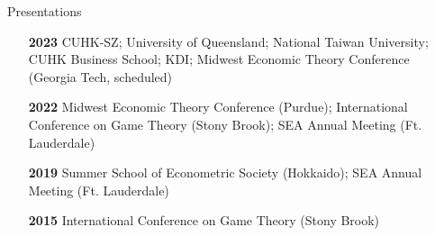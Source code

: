 \begin{rSection}{Presentations}

\begin{itemize}
	\item [\textbf{2023}] CUHK-SZ; University of Queensland; National Taiwan University; CUHK Business School; KDI; Midwest Economic Theory Conference (Georgia Tech, scheduled)
	\item [\textbf{2022}] Midwest Economic Theory Conference (Purdue); International Conference on Game Theory (Stony Brook); SEA Annual Meeting (Ft. Lauderdale)
	\item [\textbf{2019}] Summer School of Econometric Society (Hokkaido); SEA Annual Meeting (Ft. Lauderdale)
	\item [\textbf{2015}] International Conference on Game Theory (Stony Brook)
\end{itemize}
	

\end{rSection}